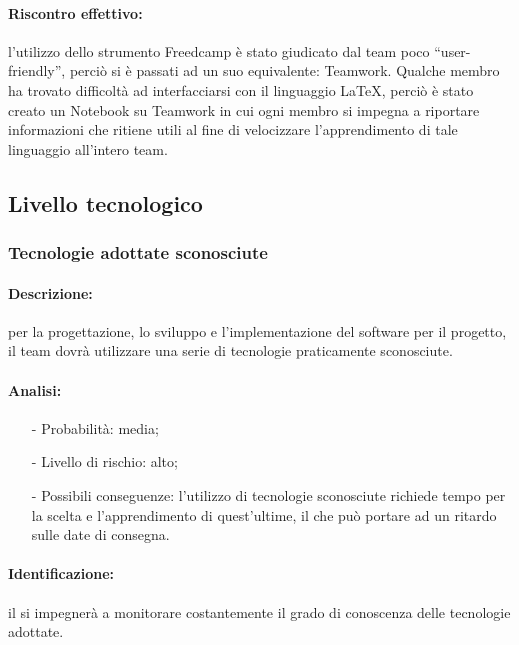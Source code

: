 \documentclass[../PianoProgetto.tex]{subfiles}
\begin{document}
	\paragraph*{Riscontro effettivo:} l’utilizzo dello strumento Freedcamp è stato giudicato dal team poco “user-friendly”, perciò si è passati ad un suo equivalente: Teamwork. 	Qualche membro ha trovato difficoltà ad interfacciarsi con il linguaggio LaTeX, perciò è stato creato un Notebook su Teamwork in cui ogni membro si impegna a riportare informazioni che ritiene utili al fine di velocizzare l’apprendimento di tale linguaggio all’intero team.

\subsection{Livello tecnologico}

\subsubsection{Tecnologie adottate sconosciute}

	\paragraph*{Descrizione:} per la progettazione, lo sviluppo e l’implementazione del software per il progetto, il team dovrà utilizzare una serie di tecnologie praticamente sconosciute.
	
	\paragraph*{Analisi:}
	\begin{itemize}
		\item[-] Probabilità: media;
		\item[-] Livello di rischio: alto;
		\item[-] Possibili conseguenze: l’utilizzo di tecnologie sconosciute richiede tempo per la scelta e l’apprendimento di quest’ultime, il che può portare ad un ritardo sulle date di consegna.
	\end{itemize}
	
	\paragraph*{Identificazione:} il \responsabilediprogetto si impegnerà a monitorare costantemente il grado di conoscenza delle tecnologie adottate.
	
\end{document}
